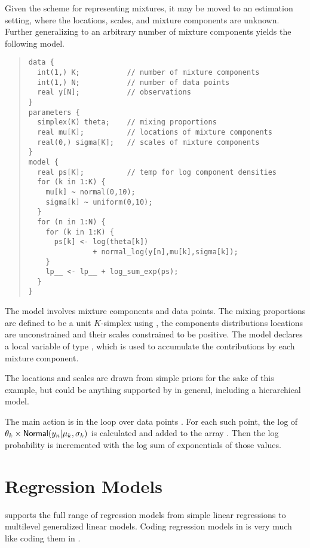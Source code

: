 Given the scheme for representing mixtures, it may be moved to an
estimation setting, where the locations, scales, and mixture
components are unknown.  Further generalizing to an arbitrary number
of mixture components yields the following model.
%
\begin{quote}
\begin{Verbatim}
data {
  int(1,) K;           // number of mixture components
  int(1,) N;           // number of data points
  real y[N];           // observations
}
parameters {
  simplex(K) theta;    // mixing proportions
  real mu[K];          // locations of mixture components
  real(0,) sigma[K];   // scales of mixture components
}
model {
  real ps[K];          // temp for log component densities
  for (k in 1:K) {
    mu[k] ~ normal(0,10);
    sigma[k] ~ uniform(0,10);
  }
  for (n in 1:N) {
    for (k in 1:K) {
      ps[k] <- log(theta[k]) 
               + normal_log(y[n],mu[k],sigma[k]);
    }
    lp__ <- lp__ + log_sum_exp(ps);    
  }
}
\end{Verbatim}
\end{quote}
%
The model involves  mixture components and  data
points.  The mixing proportions are defined to be a unit $K$-simplex
using , the components distributions locations
 are unconstrained and their scales 
constrained to be positive.  The model declares a local variable
 of type , which is used to accumulate the
contributions by each mixture component.

The locations and scales are drawn from simple priors for the sake of
this example, but could be anything supported by \Stan in general,
including a hierarchical model.  

The main action is in the loop over data points .  For each
such point, the log of $\theta_k \times
\mbox{\sf Normal}(y_n|\mu_k,\sigma_k)$ is calculated and added to the
array .  Then the log probability is incremented with the log
sum of exponentials of those values.





\chapter{Regression Models}

\Stan supports the full range of regression models from simple linear
regressions to multilevel generalized linear models.  Coding
regression models in \Stan is very much like coding them in \BUGS.

